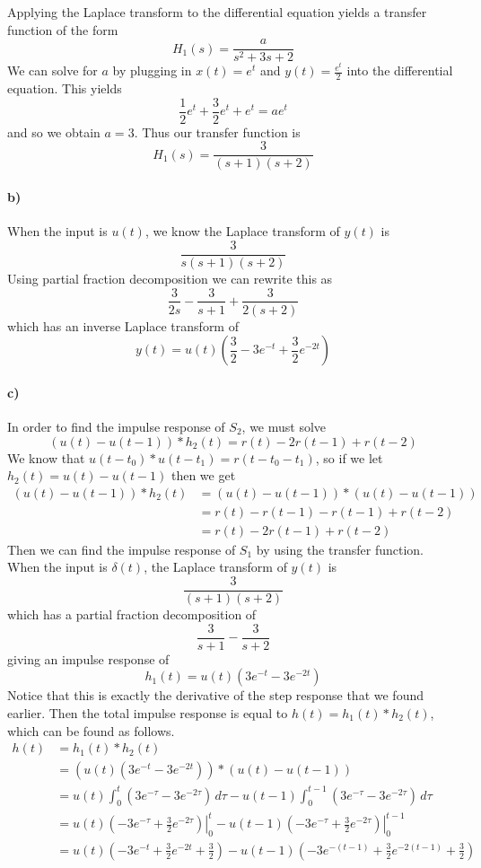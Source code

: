 \documentclass[12pt]{article}
\begin{document}
Applying the Laplace transform to the differential equation yields a transfer function of the form
\[H_1(s)=\frac{a}{s^2+3s+2}\]
We can solve for \(a\) by plugging in \(x(t)=e^t\) and \(y(t)=\frac{e^t}{2}\) into the differential equation. This yields
\[\frac{1}{2}e^t+\frac{3}{2}e^t+e^t = ae^t\]
and so we obtain \(a=3\). Thus our transfer function is
\[H_1(s)=\frac{3}{(s+1)(s+2)}\]

\paragraph{b)}

When the input is \(u(t)\), we know the Laplace transform of \(y(t)\) is
\[\frac{3}{s(s+1)(s+2)}\]
Using partial fraction decomposition we can rewrite this as
\[\frac{3}{2s}-\frac{3}{s+1}+\frac{3}{2(s+2)}\]
which has an inverse Laplace transform of
\[y(t)=u(t)\left(\frac{3}{2}-3e^{-t}+\frac{3}{2}e^{-2t}\right)\]

\paragraph{c)}

In order to find the impulse response of \(S_2\), we must solve
\[(u(t)-u(t-1))*h_2(t)=r(t)-2r(t-1)+r(t-2)\]
We know that \(u(t-t_0)*u(t-t_1) = r(t-t_0-t_1)\), so if we let \(h_2(t)=u(t)-u(t-1)\) then we get
\begin{align*}
    (u(t)-u(t-1))*h_2(t)&=(u(t)-u(t-1))*(u(t)-u(t-1))\\
    &=r(t)-r(t-1)-r(t-1)+r(t-2)\\
    &=r(t)-2r(t-1)+r(t-2)
\end{align*}
Then we can find the impulse response of \(S_1\) by using the transfer function. When the input is \(\delta(t)\), the Laplace transform of \(y(t)\) is
\[\frac{3}{(s+1)(s+2)}\]
which has a partial fraction decomposition of
\[\frac{3}{s+1}-\frac{3}{s+2}\]
giving an impulse response of
\[h_1(t)=u(t)(3e^{-t}-3e^{-2t})\]
Notice that this is exactly the derivative of the step response that we found earlier. Then the total impulse response is equal to \(h(t)=h_1(t)*h_2(t)\),
which can be found as follows.
\begin{align*}
    h(t)&=h_1(t)*h_2(t)\\
    &=(u(t)(3e^{-t}-3e^{-2t}))*(u(t)-u(t-1))\\
    &=u(t)\int_0^t (3e^{-\tau}-3e^{-2\tau})\,d\tau-u(t-1)\int_0^{t-1}(3e^{-\tau}-3e^{-2\tau})\,d\tau\\
    &=u(t)\left.\left(-3e^{-\tau}+\frac{3}{2}e^{-2\tau}\right)\right|_0^t-u(t-1)\left.\left(-3e^{-\tau}+\frac{3}{2}e^{-2\tau}\right)\right|_0^{t-1}\\
    &=u(t)\left(-3e^{-t}+\frac{3}{2}e^{-2t}+\frac{3}{2}\right)-u(t-1)\left(-3e^{-(t-1)}+\frac{3}{2}e^{-2(t-1)}+\frac{3}{2}\right)
\end{align*}
\end{document}
